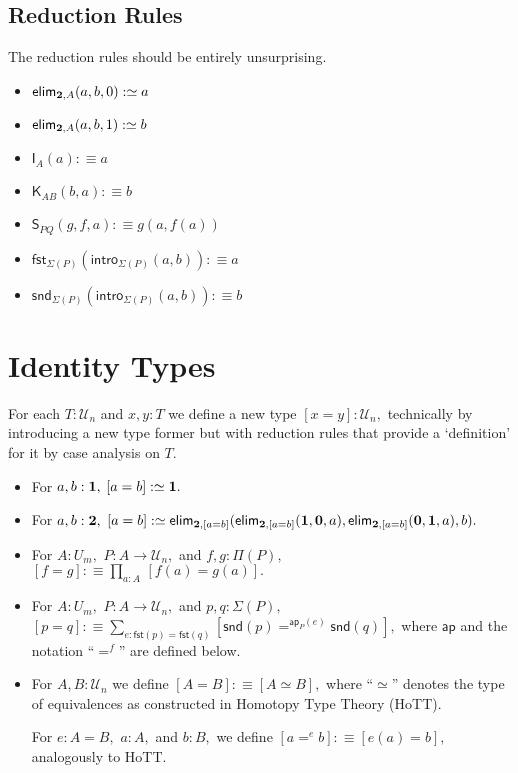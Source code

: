 \documentclass[a4paper]{article}
\theoremstyle{definition}
\theoremstyle{remark}
\let\defeq\equiv
\renewcommand{\equiv}{\simeq}
\newcommand{\pathOver}[1]{=^{#1}}
\newcommand{\univVar}{\mathcal}
\newcommand{\U}{\univVar{U}}
\newcommand{\0}{\primType{0}}
\newcommand{\1}{\primType{1}}
\newcommand{\2}{\primType{2}}
\newcommand{\nm}{\mathsf}
\newcommand{\intro}{\nm{intro}}
\newcommand{\elim}{\nm{elim}}
\newcommand{\fst}{\nm{fst}}
\newcommand{\snd}{\nm{snd}}
\newcommand{\ap}{\nm{ap}}
\newcommand{\combinator}{\nm}
\newcommand{\idFun}{\combinator{I}}
\newcommand{\constFun}{\combinator{K}}
\newcommand{\revSubstFun}{\combinator{S}}
\begin{document}
\subsection{Reduction Rules}

The reduction rules should be entirely unsurprising.
\begin{itemize}
  \item $\elim_{\2,A}(a,b,0) :\defeq a$
  \item $\elim_{\2,A}(a,b,1) :\defeq b$
  \item $\idFun_A(a) :\defeq a$
  \item $\constFun_{AB}(b,a) :\defeq b$
  \item $\revSubstFun_{PQ}(g,f,a) :\defeq g(a,f(a))$
  \item $\fst_{\Sigma(P)}(\intro_{\Sigma(P)}(a,b)) :\defeq a$
  \item $\snd_{\Sigma(P)}(\intro_{\Sigma(P)}(a,b)) :\defeq b$
\end{itemize}

\section{Identity Types}

For each $T : \U_n$ and $x,y : T$ we define a new type $[x = y] : \U_n,$ technically by introducing
a new type former but with reduction rules that provide a `definition' for it by case analysis on
$T.$
\begin{itemize}
  \item For $a,b : \1,$ $[a = b] :\defeq \1.$
  \item For $a,b : \2,$ $[a = b] :\defeq \elim_{\2, [a = b]}(\elim_{\2, [a = b]}(\1, \0, a), \elim_{\2, [a = b]}(\0, \1, a),b).$
  \item For $A : U_m,$ $P : A \to \U_n,$ and $f,g : \Pi(P),$
  $[f = g] :\defeq \prod_{a : A}\,[f(a) = g(a)].$
  \item For $A : U_m,$ $P : A \to \U_n,$ and $p,q : \Sigma(P),$
  $[p = q] :\defeq \sum_{e : \fst(p) = \fst(q)} [\snd(p) \pathOver{\ap_P(e)} \snd(q)],$
  where $\ap$ and the notation ``$\pathOver{f}$'' are defined below.
  \item For $A,B : \U_n$ we define $[A = B] :\defeq [A \equiv B],$ where ``$\equiv$'' denotes the
  type of equivalences as constructed in Homotopy Type Theory (HoTT).

  For $e : A = B,$ $a : A,$ and $b : B,$ we define $[a \pathOver{e} b] :\defeq [e(a) = b],$
  analogously to HoTT.
\end{itemize}
\end{document}
